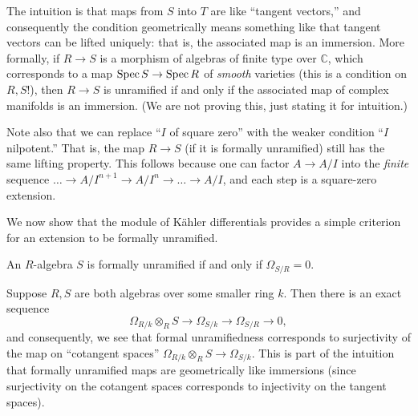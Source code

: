 The intuition is that maps from $S$ into $T$ are like ``tangent vectors,'' and
consequently the condition geometrically means something like that tangent
vectors can be lifted uniquely: that is, the associated map is an immersion.
More formally, if $R\to  S$ is a morphism of algebras of finite type
over $\mathbb{C}$, which corresponds to a map $\operatorname{Spec} S \to \operatorname{Spec} R$ of
\emph{smooth} varieties (this is a condition on $R, S$!), then $R \to S$ is
unramified if and only if the  associated map of complex manifolds is an
immersion. (We are not proving this, just stating it for intuition.)

Note also that we can replace ``$I$ of square zero'' with the weaker condition
``$I$ nilpotent.'' That is, the map $R \to S$ (if it is formally unramified)
still has the same lifting property. This follows because one can factor $A \to
A/I$ into the \emph{finite} sequence $\dots \to A/I^{n+1} \to A/I^{n} \to \dots
\to A/I$, and each step is a square-zero extension.


We now show that the module of K\"ahler differentials provides a simple
criterion for an extension to be formally unramified.
\begin{proposition} \label{formalunrmeansomegazero}
An $R$-algebra $S$ is formally unramified if and only if $\Omega_{S/R} = 0$.
\end{proposition} 

Suppose $R, S$ are both algebras over some smaller ring $k$. 
Then there is an exact sequence
\[ \Omega_{R/k}\otimes_R S \to \Omega_{S/k} \to \Omega_{S/R} \to 0,  \]
and consequently, we see that formal unramifiedness corresponds to surjectivity
of the map on ``cotangent spaces'' $\Omega_{R/k} \otimes_R S \to \Omega_{S/k}$. 
This is part of the intuition that formally unramified maps are geometrically
like immersions (since surjectivity on the cotangent spaces corresponds to
injectivity on the tangent spaces).

